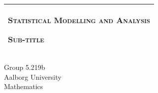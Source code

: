 %
%
%
%
%
\begin{titlepage}
  \addtolength{\hoffset}{0.5\evensidemargin-0.5\oddsidemargin} %
  \noindent%
  \begin{tabular}{@{}p{\textwidth}@{}}
    \toprule[2pt]
    \midrule
    \vspace{0.4cm}
    \begin{center}
    \Huge{\textsc{Statistical Modelling and Analysis}}
    \end{center}
    \vspace{0.4cm}
   \begin{center}
    \Large{\textsc{Sub-title}}%
    \end{center}
    \vspace{0.4cm}\\
    \midrule
    \toprule[2pt]
  \end{tabular}
  \vspace{0.8cm}
  \setlength\fboxsep{0pt}
    \setlength\fboxsep{5pt}
  \vfill
\begin{center}
  {\large{Group 5.219b} \\
    {Aalborg University} \\
    {Mathematics} \\}
\end{center}
  
\end{titlepage}
